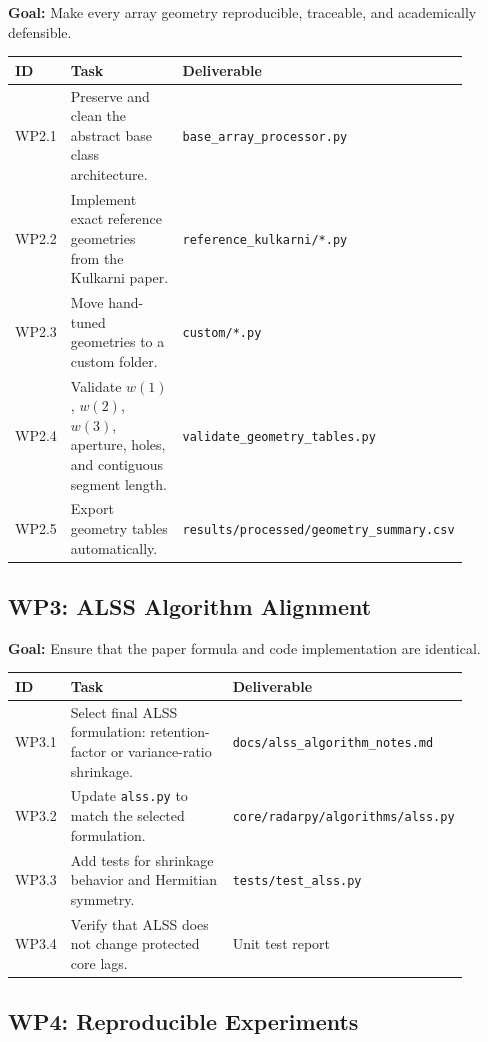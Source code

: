 \documentclass[11pt,letterpaper]{article}
\newcommand{\codepath}[1]{\texttt{#1}}
\begin{document}
\textbf{Goal:} Make every array geometry reproducible, traceable, and academically defensible.

\begin{longtable}{p{0.08\linewidth}p{0.52\linewidth}p{0.30\linewidth}}
\toprule
ID & Task & Deliverable \\
\midrule
WP2.1 & Preserve and clean the abstract base class architecture. & \codepath{base\_array\_processor.py} \\
WP2.2 & Implement exact reference geometries from the Kulkarni paper. & \codepath{reference\_kulkarni/*.py} \\
WP2.3 & Move hand-tuned geometries to a custom folder. & \codepath{custom/*.py} \\
WP2.4 & Validate $w(1)$, $w(2)$, $w(3)$, aperture, holes, and contiguous segment length. & \codepath{validate\_geometry\_tables.py} \\
WP2.5 & Export geometry tables automatically. & \codepath{results/processed/geometry\_summary.csv} \\
\bottomrule
\end{longtable}

\subsection{WP3: ALSS Algorithm Alignment}

\textbf{Goal:} Ensure that the paper formula and code implementation are identical.

\begin{longtable}{p{0.08\linewidth}p{0.52\linewidth}p{0.30\linewidth}}
\toprule
ID & Task & Deliverable \\
\midrule
WP3.1 & Select final ALSS formulation: retention-factor or variance-ratio shrinkage. & \codepath{docs/alss\_algorithm\_notes.md} \\
WP3.2 & Update \codepath{alss.py} to match the selected formulation. & \codepath{core/radarpy/algorithms/alss.py} \\
WP3.3 & Add tests for shrinkage behavior and Hermitian symmetry. & \codepath{tests/test\_alss.py} \\
WP3.4 & Verify that ALSS does not change protected core lags. & Unit test report \\
\bottomrule
\end{longtable}

\subsection{WP4: Reproducible Experiments}
\end{document}
